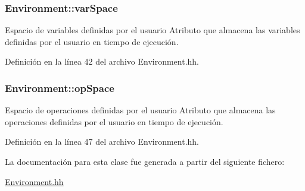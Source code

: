 \subsubsection[{\texorpdfstring{var\+Space}{varSpace}}]{ Environment\+::var\+Space\hspace{0.3cm}{\ttfamily [private]}}\hypertarget{class_environment_aedf0507f98713f9eb6c152d93c346aa4}{}\label{class_environment_aedf0507f98713f9eb6c152d93c346aa4}


Espacio de variables definidas por el usuario Atributo que almacena las variables definidas por el usuario en tiempo de ejecución. 



Definición en la línea 42 del archivo Environment.\+hh.

\subsubsection[{\texorpdfstring{op\+Space}{opSpace}}]{ Environment\+::op\+Space\hspace{0.3cm}{\ttfamily [private]}}\hypertarget{class_environment_a7ab0af9a002f7df22966678a0dd0c366}{}\label{class_environment_a7ab0af9a002f7df22966678a0dd0c366}


Espacio de operaciones definidas por el usuario Atributo que almacena las operaciones definidas por el usuario en tiempo de ejecución. 



Definición en la línea 47 del archivo Environment.\+hh.



La documentación para esta clase fue generada a partir del siguiente fichero\+:\begin{DoxyCompactItemize}
\item 
\hyperlink{_environment_8hh}{Environment.\+hh}\end{DoxyCompactItemize}
